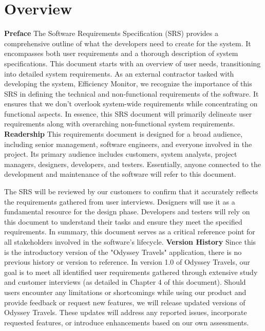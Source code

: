 \documentclass{scrreprt}
\begin{document}
\chapter{Overview}
{\LARGE\textbf{Preface}}
\newline
\newline
The Software Requirements Specification (SRS) provides a comprehensive outline of what the developers need to create for the system. It encompasses both user requirements and a thorough description of system specifications. This document starts with an overview of user needs, transitioning into detailed system requirements.
As an external contractor tasked with developing the system, Efficiency Monitor, we recognize the importance of this SRS in defining the technical and non-functional requirements of the software. It ensures that we don't overlook system-wide requirements while concentrating on functional aspects.
In essence, this SRS document will primarily delineate user requirements along with overarching non-functional system requirements.
\newline
\newline
{\LARGE\textbf{Readership}}
\newline
\newline
This requirements document is designed for a broad audience, including senior management, software engineers, and everyone involved in the project. Its primary audience includes customers, system analysts, project managers, designers, developers, and testers. Essentially, anyone connected to the development and maintenance of the software will refer to this document.

The SRS will be reviewed by our customers to confirm that it accurately reflects the requirements gathered from user interviews. Designers will use it as a fundamental resource for the design phase. Developers and testers will rely on this document to understand their tasks and ensure they meet the specified requirements. In summary, this document serves as a critical reference point for all stakeholders involved in the software's lifecycle.
\newline
\newline
{\LARGE\textbf{Version History}}
\newline
\newline
Since this is the introductory version of the "Odyssey Travels" application, there is no previous history or version to reference. In version 1.0 of Odyssey Travels, our goal is to meet all identified user requirements gathered through extensive study and customer interviews (as detailed in Chapter 4 of this document).
Should users encounter any limitations or shortcomings while using our product and provide feedback or request new features, we will release updated versions of Odyssey Travels. These updates will address any reported issues, incorporate requested features, or introduce enhancements based on our own assessments.
\end{document}
